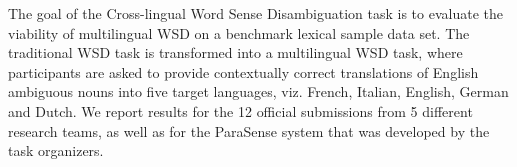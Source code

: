 The goal of the Cross-lingual Word Sense Disambiguation task is to evaluate the viability of multilingual WSD on a benchmark lexical sample data set. The
 traditional WSD task is transformed into a multilingual WSD task, where
 participants are asked to provide contextually correct translations of English
 ambiguous nouns into five target languages, viz. French, Italian, English,
 German and Dutch. We report results for the 12 official submissions from 5
 different research teams, as well as for the ParaSense system that was
 developed by the task organizers.

